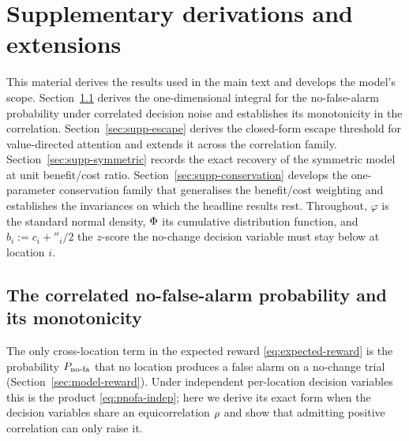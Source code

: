
\appendix
\section{Supplementary derivations and extensions}
\label{sec:appendix}

This material derives the results used in the main text and develops the
model's scope. Section~\ref{sec:supp-decorrelation} derives the
one-dimensional integral for the no-false-alarm probability under
correlated decision noise and establishes its monotonicity in the
correlation. Section~\ref{sec:supp-escape} derives the closed-form
escape threshold for value-directed attention and extends it across the
correlation family. Section~\ref{sec:supp-symmetric} records the exact
recovery of the symmetric model at unit benefit/cost ratio.
Section~\ref{sec:supp-conservation} develops the one-parameter
conservation family that generalises the benefit/cost weighting and
establishes the invariances on which the headline results rest.
Throughout, $\varphi$ is the standard normal density, $\Phi$ its
cumulative distribution function, and $b_i := c_i + \dprime_i/2$ the
$z$-score the no-change decision variable must stay below at location
$i$.

\subsection{The correlated no-false-alarm probability and its
monotonicity}
\label{sec:supp-decorrelation}

The only cross-location term in the expected reward
\eqref{eq:expected-reward} is the probability $P_{\mathrm{no\text{-}fa}}$ that no location
produces a false alarm on a no-change trial
(Section~\ref{sec:model-reward}). Under independent per-location
decision variables this is the product
\eqref{eq:pnofa-indep}; here we derive its exact form when the decision
variables share an equicorrelation $\rho$ and show that admitting
positive correlation can only raise it.


